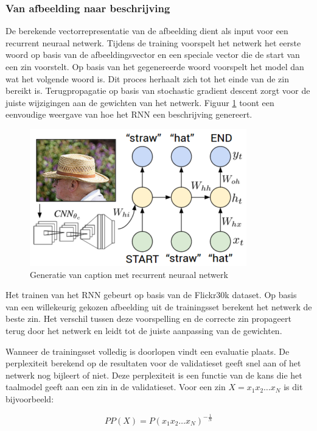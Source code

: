 \subsubsection{Van afbeelding naar beschrijving}
De berekende vectorrepresentatie van de afbeelding dient als input voor een recurrent neuraal netwerk. Tijdens de training voorspelt het netwerk het eerste woord op basis van de afbeeldingsvector en een speciale vector die de start van een zin voorstelt. Op basis van het gegenereerde woord voorspelt het model dan wat het volgende woord is. Dit proces herhaalt zich tot het einde van de zin bereikt is. Terugpropagatie op basis van stochastic gradient descent zorgt voor de juiste wijzigingen aan de gewichten van het netwerk. Figuur \ref{fig:rnntraining} toont een eenvoudige weergave van hoe het RNN een beschrijving genereert.

\begin{figure}[tb]
    \centering
    \includegraphics[width=0.5\linewidth]{Images/karpathy.PNG}
    \caption{Generatie van caption met recurrent neuraal netwerk}
\label{fig:rnntraining}
\end{figure}

Het trainen van het RNN gebeurt op basis van de Flickr30k dataset. 
Op basis van een willekeurig gekozen afbeelding uit de trainingsset berekent het netwerk de beste zin. Het verschil tussen deze voorspelling en de correcte zin propageert terug door het netwerk en leidt tot de juiste aanpassing van de gewichten.

Wanneer de trainingsset volledig is doorlopen vindt een evaluatie plaats. De perplexiteit berekend op de resultaten voor de validatieset geeft snel aan of het netwerk nog bijleert of niet. Deze perplexiteit is een functie van de kans die het taalmodel geeft aan een zin in de validatieset. Voor een zin $X=x_1x_2\dots x_N$ is dit bijvoorbeeld\cite{Jurafsky:2009:SLP:1214993}:

\begin{equation}
PP(X)=P(x_1x_2\dots x_N)^{-\frac{1}{N}}
\end{equation}

